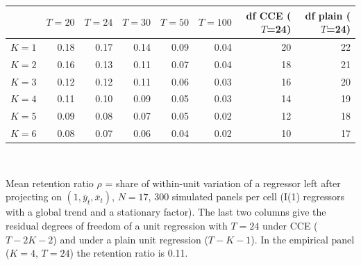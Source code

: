 \begin{tabular}{lrrrrrrr}\toprule
 & $T=20$ & $T=24$ & $T=30$ & $T=50$ & $T=100$ & df CCE ($T$=24) & df plain ($T$=24) \\
\midrule
$K=1$ & 0.18 & 0.17 & 0.14 & 0.09 & 0.04 & 20 & 22 \\
$K=2$ & 0.16 & 0.13 & 0.11 & 0.07 & 0.04 & 18 & 21 \\
$K=3$ & 0.12 & 0.12 & 0.11 & 0.06 & 0.03 & 16 & 20 \\
$K=4$ & 0.11 & 0.10 & 0.09 & 0.05 & 0.03 & 14 & 19 \\
$K=5$ & 0.09 & 0.08 & 0.07 & 0.05 & 0.02 & 12 & 18 \\
$K=6$ & 0.08 & 0.07 & 0.06 & 0.04 & 0.02 & 10 & 17 \\
\bottomrule\end{tabular}
\\[3pt]\begin{minipage}{\tablewidth}\footnotesize Mean retention ratio $\rho$ = share of within-unit variation of a regressor left after projecting on $(1,\bar y_t,\bar x_t)$, $N=17$, 300 simulated panels per cell (I(1) regressors with a global trend and a stationary factor). The last two columns give the residual degrees of freedom of a unit regression with $T=24$ under CCE ($T-2K-2$) and under a plain unit regression ($T-K-1$). In the empirical panel ($K=4$, $T=24$) the retention ratio is 0.11.\end{minipage}
